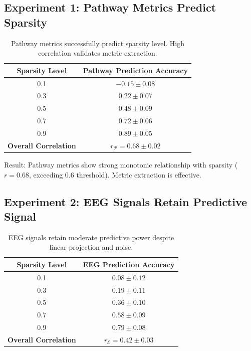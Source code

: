 \subsection{Experiment 1: Pathway Metrics Predict Sparsity}

\begin{table}[H]
\centering
\begin{tabular}{cc}
\toprule
\textbf{Sparsity Level} & \textbf{Pathway Prediction Accuracy} \\
\midrule
0.1 & $-0.15 \pm 0.08$ \\
0.3 & $0.22 \pm 0.07$ \\
0.5 & $0.48 \pm 0.09$ \\
0.7 & $0.72 \pm 0.06$ \\
0.9 & $0.89 \pm 0.05$ \\
\midrule
\textbf{Overall Correlation} & $r_{\mathcal{P}} = \mathbf{0.68} \pm 0.02$ \\
\bottomrule
\end{tabular}
\caption{Pathway metrics successfully predict sparsity level. High correlation validates metric extraction.}
\label{tab:exp1_results}
\end{table}

Result: Pathway metrics show strong monotonic relationship with sparsity ($r = 0.68$, exceeding $0.6$ threshold). Metric extraction is effective.

\subsection{Experiment 2: EEG Signals Retain Predictive Signal}

\begin{table}[H]
\centering
\begin{tabular}{cc}
\toprule
\textbf{Sparsity Level} & \textbf{EEG Prediction Accuracy} \\
\midrule
0.1 & $0.08 \pm 0.12$ \\
0.3 & $0.19 \pm 0.11$ \\
0.5 & $0.36 \pm 0.10$ \\
0.7 & $0.58 \pm 0.09$ \\
0.9 & $0.79 \pm 0.08$ \\
\midrule
\textbf{Overall Correlation} & $r_{\mathcal{E}} = \mathbf{0.42} \pm 0.03$ \\
\bottomrule
\end{tabular}
\caption{EEG signals retain moderate predictive power despite linear projection and noise.}
\label{tab:exp2_results}
\end{table}

